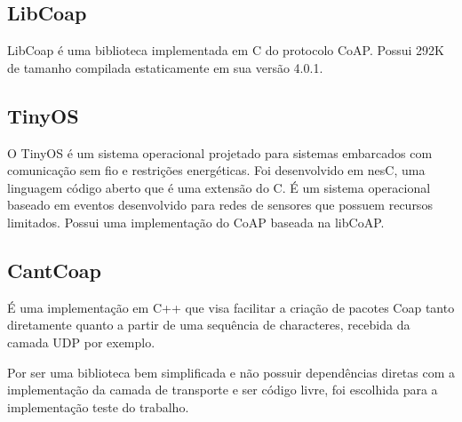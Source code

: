 \subsection{LibCoap}
LibCoap \'e uma biblioteca implementada em C do protocolo CoAP. Possui 292K de tamanho compilada estaticamente em sua vers\~ao 4.0.1.


\subsection{TinyOS}
O TinyOS \'e um sistema operacional projetado para sistemas embarcados com comunica\c{c}\~ao sem fio e restri\c{c}\~oes energ\'eticas. Foi desenvolvido em nesC, uma linguagem c\'odigo aberto que \'e uma extens\~ao do C. \'E um sistema operacional baseado em eventos desenvolvido para redes de sensores que possuem recursos limitados. Possui uma implementa\c{c}\~ao do CoAP baseada na libCoAP.

\subsection{CantCoap}
\'E uma implementa\c{c}\~ao em C++ que visa facilitar a cria\c{c}\~ao de pacotes Coap tanto diretamente quanto a partir de uma sequ\^encia de characteres, recebida da camada UDP por exemplo.

Por ser uma biblioteca bem simplificada e n\~ao possuir depend\^encias diretas com a implementa\c{c}\~ao da camada de transporte e ser c\'odigo livre, foi escolhida para a implementa\c{c}\~ao teste do trabalho.

